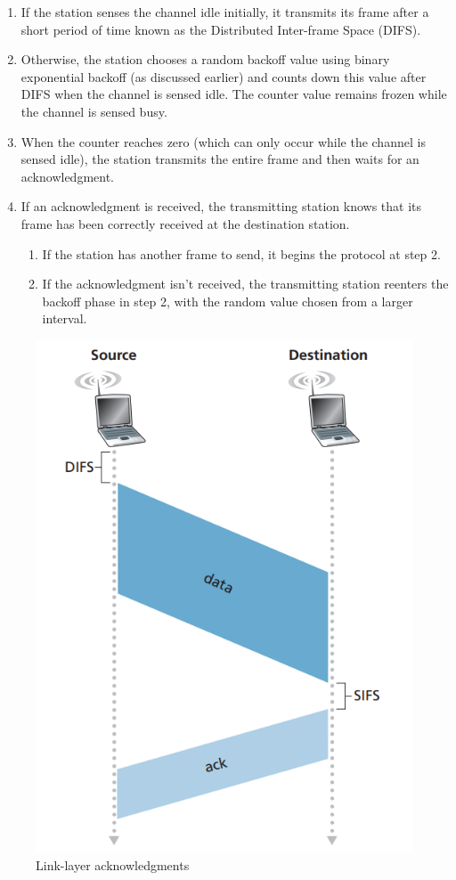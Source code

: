 \begin{enumerate}
    \item If the station senses the channel idle initially, it transmits its frame after a short period of time known as the Distributed Inter-frame Space (DIFS).
    \item Otherwise, the station chooses a random backoff value using binary exponential backoff (as discussed earlier) and counts down this value after DIFS when the channel is sensed idle. The counter value remains frozen while the channel is sensed busy.
    \item When the counter reaches zero (which can only occur while the channel is sensed idle), the station transmits the entire frame and then waits for an acknowledgment.
    \item If an acknowledgment is received, the transmitting station knows that its frame has been correctly received at the destination station.
    \begin{enumerate}
        \item If the station has another frame to send, it begins the protocol at step 2.
        \item If the acknowledgment isn't received, the transmitting station reenters the backoff phase in step 2, with the random value chosen from a larger interval.
    \end{enumerate}
\end{enumerate}

\begin{figure}[H]
    \centering
    \includegraphics[width = 0.55\linewidth]{img/5/link-layer-ack.png}
    \caption{Link-layer acknowledgments \cite{Kurose2017}}
    \label{fig:link-layer-ack}
\end{figure}

